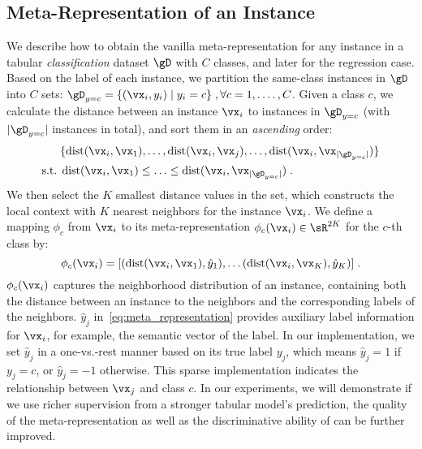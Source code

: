 \subsection{Meta-Representation of an Instance}\label{sec:meta_Rep}
We describe how to obtain the vanilla meta-representation for any instance in a tabular {\em classification} dataset $\gD$ with $C$ classes, and later for the regression case. 
Based on the label of each instance, we partition the same-class instances in $\gD$ into $C$ sets: $\gD_{y=c} = \{(\vx_i, y_i)\;|\;y_i=c\}\;, \forall c=1,.\ldots, C$. 
Given a class $c$, we calculate the distance between an instance $\vx_i$ to instances in $\gD_{y=c}$ (with $|\gD_{y=c}|$ instances in total), and sort them in an {\em ascending} order: 
\begin{align}
    &\{\operatorname{dist}(\vx_i, \vx_1),\ldots,\operatorname{dist}(\vx_i, \vx_j),\ldots,\operatorname{dist}(\vx_i, \vx_{|\gD_{y=c}|})\}\notag\\
    {\rm s.t.}\;
    &\operatorname{dist}(\vx_i, \vx_1)\le\ldots\le\operatorname{dist}(\vx_i, \vx_{|\gD_{y=c}|})\;.\label{eq:calculate_distance}
\end{align}
We then select the $K$ smallest distance values in the set, which constructs the local context with $K$ nearest neighbors for the instance $\vx_i$. We define a mapping $\phi_c$ from $\vx_i$ to its meta-representation $\phi_c(\vx_i)\in\sR^{2K}$ for the $c$-th class by:
\begin{equation}
    \phi_c(\vx_i) = [(\operatorname{dist}(\vx_i, \vx_1), \hat{y}_1),\ldots (\operatorname{dist}(\vx_i, \vx_{K}), \hat{y}_K)]\;.\label{eq:meta_representation}
\end{equation}
$\phi_c(\vx_i)$ captures the neighborhood distribution of an instance, containing both the distance between an instance to the neighbors and the corresponding labels of the neighbors. 
$\hat{y}_j$ in~\autoref{eq:meta_representation} provides auxiliary label information for $\vx_i$, for example, the semantic vector of the label. In our implementation, we set $\hat{y}_j$ in a one-vs.-rest manner based on its true label $y_j$, which means $\hat{y}_j=1$ if $y_j = c$, or $\hat{y}_j=-1$ otherwise. This sparse implementation indicates the relationship between $\vx_j$ and class $c$. In our experiments, we will demonstrate if we use richer supervision from a stronger tabular model's prediction, the quality of the meta-representation as well as the discriminative ability of \ours can be further improved. 

